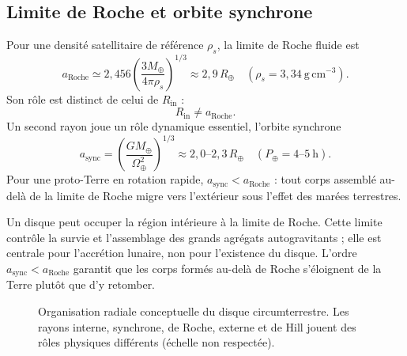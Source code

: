 \documentclass[11pt,a4paper,openany]{report}
\newcommand{\Mt}{M_{\oplus}}
\newcommand{\Rt}{R_{\oplus}}
\newcommand{\aR}{a_{\mathrm{Roche}}}
\begin{document}
\subsection{Limite de Roche et orbite synchrone}

Pour une densité satellitaire de référence $\rho_s$, la limite de Roche fluide est
\begin{equation}
\aR\simeq2{,}456\left(\frac{3\Mt}{4\pi\rho_s}\right)^{1/3}
\approx2{,}9\,\Rt\quad(\rho_s=3{,}34\ \mathrm{g\,cm^{-3}}).
\label{eq:Roche}
\end{equation}
Son rôle est distinct de celui de $R_{\mathrm{in}}$ :
\begin{equation}
R_{\mathrm{in}}\neq\aR.
\label{eq:RinRoche}
\end{equation}
Un second rayon joue un rôle dynamique essentiel, l'orbite synchrone
\begin{equation}
a_{\mathrm{sync}}=\left(\frac{G\Mt}{\Omega_\oplus^2}\right)^{1/3}\approx2{,}0\text{--}2{,}3\,\Rt
\quad(P_\oplus=4\text{--}5\ \mathrm{h}).
\label{eq:async}
\end{equation}
Pour une proto-Terre en rotation rapide, $a_{\mathrm{sync}}<\aR$ : tout corps assemblé au-delà de
la limite de Roche migre vers l'extérieur sous l'effet des marées terrestres.

\begin{lecture}
Un disque peut occuper la région intérieure à la limite de Roche. Cette limite contrôle la survie
et l'assemblage des grands agrégats autogravitants ; elle est centrale pour l'accrétion lunaire,
non pour l'existence du disque. L'ordre $a_{\mathrm{sync}}<\aR$ garantit que les corps formés
au-delà de Roche s'éloignent de la Terre plutôt que d'y retomber.
\end{lecture}

\begin{figure}[htbp]
\centering
{}
\caption{Organisation radiale conceptuelle du disque circumterrestre. Les rayons interne,
synchrone, de Roche, externe et de Hill jouent des rôles physiques différents (échelle non
respectée).}
\label{fig:radial}
\end{figure}
\end{document}
